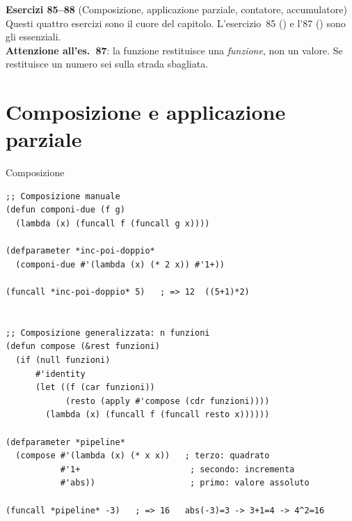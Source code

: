 \begin{workbook}
\textbf{Esercizi 85--88}
(Composizione, applicazione parziale, contatore, accumulatore)\\[4pt]
Questi quattro esercizi sono il cuore del capitolo.
L'esercizio~85 () e l'87 () sono gli essenziali.\\[4pt]
\textbf{Attenzione all'es.~87}: la funzione restituisce una \emph{funzione},
non un valore. Se  restituisce un numero sei sulla
strada sbagliata.
\end{workbook}

\section{Composizione e applicazione parziale}


\begin{concetto}{Composizione}
\end{concetto}

\begin{esempio}
\begin{lstlisting}
;; Composizione manuale
(defun componi-due (f g)
  (lambda (x) (funcall f (funcall g x))))

(defparameter *inc-poi-doppio*
  (componi-due #'(lambda (x) (* 2 x)) #'1+))

(funcall *inc-poi-doppio* 5)   ; => 12  ((5+1)*2)


;; Composizione generalizzata: n funzioni
(defun compose (&rest funzioni)
  (if (null funzioni)
      #'identity
      (let ((f (car funzioni))
            (resto (apply #'compose (cdr funzioni))))
        (lambda (x) (funcall f (funcall resto x))))))

(defparameter *pipeline*
  (compose #'(lambda (x) (* x x))   ; terzo: quadrato
           #'1+                      ; secondo: incrementa
           #'abs))                   ; primo: valore assoluto

(funcall *pipeline* -3)   ; => 16   abs(-3)=3 -> 3+1=4 -> 4^2=16
\end{lstlisting}
\end{esempio}


